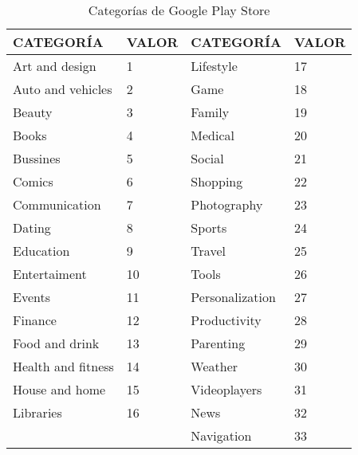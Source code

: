 \documentclass[10pt, a4paper]{article}
\begin{document}
\begin{table}[H]
\centering
\begin{tabular}{ll|l|l|}
\hline
\multicolumn{1}{|l|}{CATEGOR\'IA} & VALOR & CATEGOR\'IA & VALOR \\ \hline
\multicolumn{1}{|l|}{Art and design}             & 1     & Lifestyle                  & 17    \\ \hline
\multicolumn{1}{|l|}{Auto and vehicles}          & 2     & Game                       & 18    \\ \hline
\multicolumn{1}{|l|}{Beauty}                     & 3     & Family                     & 19    \\ \hline
\multicolumn{1}{|l|}{Books}                      & 4     & Medical                    & 20    \\ \hline
\multicolumn{1}{|l|}{Bussines}                   & 5     & Social                     & 21    \\ \hline
\multicolumn{1}{|l|}{Comics}                     & 6     & Shopping                   & 22    \\ \hline
\multicolumn{1}{|l|}{Communication}              & 7     & Photography                & 23    \\ \hline
\multicolumn{1}{|l|}{Dating}                     & 8     & Sports                     & 24    \\ \hline
\multicolumn{1}{|l|}{Education}                  & 9     & Travel                     & 25    \\ \hline
\multicolumn{1}{|l|}{Entertaiment}               & 10    & Tools                      & 26    \\ \hline
\multicolumn{1}{|l|}{Events}                     & 11    & Personalization            & 27    \\ \hline
\multicolumn{1}{|l|}{Finance}                    & 12    & Productivity               & 28    \\ \hline
\multicolumn{1}{|l|}{Food and drink}             & 13    & Parenting                  & 29    \\ \hline
\multicolumn{1}{|l|}{Health and fitness}         & 14    & Weather                    & 30    \\ \hline
\multicolumn{1}{|l|}{House and home}             & 15    & Videoplayers               & 31    \\ \hline
\multicolumn{1}{|l|}{Libraries}                  & 16    & News                       & 32    \\ \hline
                                                 &       & Navigation                 & 33    \\ \cline{3-4} 
\end{tabular}
\caption{Categor\'ias de Google Play Store}
\label{Categorias}
\end{table}
\end{document}
